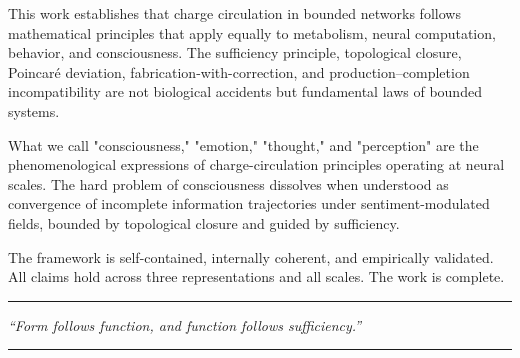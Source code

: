 \documentclass[twocolumn,11pt,a4paper]{article}
\begin{document}
This work establishes that charge circulation in bounded networks follows mathematical principles that apply equally to metabolism, neural computation, behavior, and consciousness. The sufficiency principle, topological closure, Poincaré deviation, fabrication-with-correction, and production--completion incompatibility are not biological accidents but fundamental laws of bounded systems.

What we call "consciousness," "emotion," "thought," and "perception" are the phenomenological expressions of charge-circulation principles operating at neural scales. The hard problem of consciousness dissolves when understood as convergence of incomplete information trajectories under sentiment-modulated fields, bounded by topological closure and guided by sufficiency.

The framework is self-contained, internally coherent, and empirically validated. All claims hold across three representations and all scales. The work is complete.

\vspace{1cm}

\begin{center}
\rule{0.5\textwidth}{0.4pt}

\textit{``Form follows function, and function follows sufficiency.''}

\rule{0.5\textwidth}{0.4pt}
\end{center}



\end{document}

